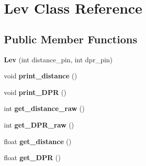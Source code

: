 \hypertarget{class_lev}{}\section{Lev Class Reference}
\label{class_lev}
\subsection*{Public Member Functions}
\begin{DoxyCompactItemize}
\item 
\mbox{\label{class_lev_a3dffa14ce6c86674c302617b9353697d}} 
{\bfseries Lev} (int distance\+\_\+pin, int dpr\+\_\+pin)
\item 
\mbox{\label{class_lev_aee46fce9894efa8a6fa12eb1d1e8b9d2}} 
void {\bfseries print\+\_\+distance} ()
\item 
\mbox{\label{class_lev_a7b37be05dea16bb6929512019d1757cb}} 
void {\bfseries print\+\_\+\+D\+PR} ()
\item 
\mbox{\label{class_lev_ad31f88897cdf43849429d33dc31cd8e8}} 
int {\bfseries get\+\_\+distance\+\_\+raw} ()
\item 
\mbox{\label{class_lev_a782697fe4f0e6c46986d62fbb7f0533b}} 
int {\bfseries get\+\_\+\+D\+P\+R\+\_\+raw} ()
\item 
\mbox{\label{class_lev_acce34a5d2c14f6f8b653277c957bd871}} 
float {\bfseries get\+\_\+distance} ()
\item 
\mbox{\label{class_lev_a4e2e92887471a32ae51a73c3cf8674bd}} 
float {\bfseries get\+\_\+\+D\+PR} ()
\end{DoxyCompactItemize}
